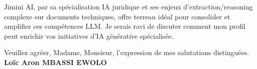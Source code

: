 \documentclass[a4paper,11pt]{article}
\begin{document}
\vspace{0.8em}
\noindent Jimini AI, par sa spécialisation IA juridique et ses enjeux d'extraction/reasoning complexe sur documents techniques, offre terreau idéal pour consolider et amplifier ces compétences LLM. Je serais ravi de discuter comment mon profil peut enrichir vos initiatives d'IA générative spécialisée.

\vspace{1.5em}
\noindent Veuillez agr\'eer, Madame, Monsieur, l'expression de mes salutations distingu\'ees.
\vspace{2em}
\noindent \textbf{Lo\"ic Aron MBASSI EWOLO}
\end{document}
